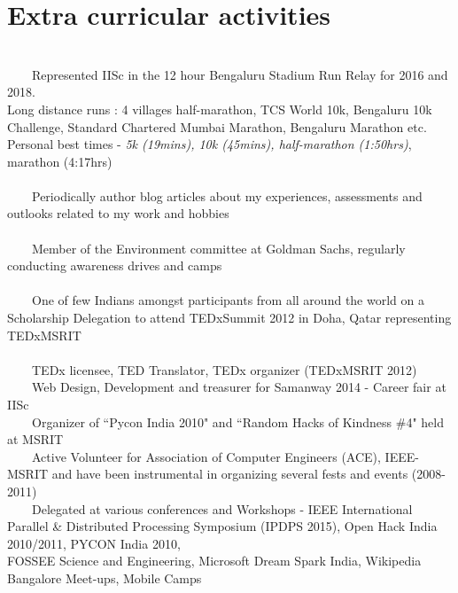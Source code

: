 \documentclass[a4paper,10pt]{article} %
\newcommand{\tabitem}{~~\llap{\textbullet}~~}
\begin{document}
\section{Extra curricular activities}
~\\
\tabitem Represented IISc in the 12 hour Bengaluru Stadium Run Relay for 2016 and 2018. \\ Long distance runs : 4 villages half-marathon, TCS World 10k, Bengaluru 10k Challenge, Standard Chartered Mumbai Marathon, Bengaluru Marathon etc. \\ {\footnotesize Personal best times - \textit{5k (19mins), \space 10k (45mins), half-marathon (1:50hrs)}, marathon (4:17hrs) }\\
\\
\tabitem Periodically author blog articles about my experiences, assessments and outlooks related to my work and hobbies \\
\\
\tabitem Member of the Environment committee at Goldman Sachs, regularly conducting awareness drives and camps \\
\\
\tabitem One of few Indians amongst participants from all around the world on a Scholarship Delegation to attend TEDxSummit 2012 in Doha, Qatar representing TEDxMSRIT \\
\\
\tabitem TEDx licensee, TED Translator, TEDx organizer (TEDxMSRIT 2012)\\
\tabitem Web Design, Development and treasurer for Samanway 2014 - Career fair at IISc \\
\tabitem Organizer of ``Pycon India 2010" and ``Random Hacks of Kindness \#4" held at MSRIT\\
\tabitem Active Volunteer for Association of Computer Engineers (ACE), IEEE-MSRIT and have been instrumental in organizing several fests and events (2008-2011)\\
\tabitem Delegated at various conferences and Workshops - IEEE International Parallel \& Distributed Processing Symposium (IPDPS 2015), Open Hack India 2010/2011, PYCON India 2010,\\ FOSSEE Science and Engineering, Microsoft Dream Spark India, Wikipedia Bangalore Meet-ups, Mobile Camps\\
\\
\end{document}
